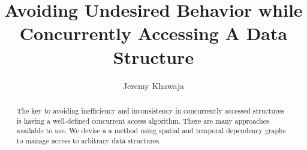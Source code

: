 \documentclass[english]{article}
\begin{document}
	
\hypersetup{
	colorlinks=true, %
	linktoc=all,     %
	linkcolor=blue,  %
}

\onecolumn
\title{Avoiding Undesired Behavior while Concurrently Accessing A Data Structure}
\author{Jeremy Khawaja}
\maketitle

\begin{abstract}
		The key to avoiding inefficiency and inconsistency in concurrently accessed structures is having a well-defined concurrent access algorithm. There are many approaches available to use. We devise a a method using spatial and temporal dependency graphs to manage access to arbitrary data structures.
\end{abstract}
\twocolumn








\onecolumn
\end{document}
